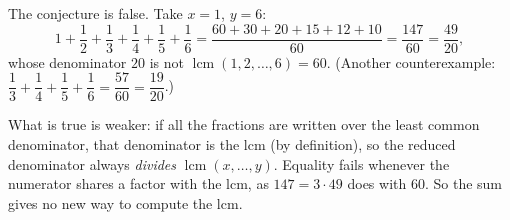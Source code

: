 The conjecture is false. Take $x=1$, $y=6$:
\[
1+\dfrac{1}{2}+\dfrac{1}{3}+\dfrac{1}{4}+\dfrac{1}{5}+\dfrac{1}{6}=\dfrac{60+30+20+15+12+10}{60}=\dfrac{147}{60}=\dfrac{49}{20},
\]
whose denominator $20$ is not $\operatorname{lcm}(1,2,\dots,6)=60$. (Another counterexample: $\dfrac{1}{3}+\dfrac{1}{4}+\dfrac{1}{5}+\dfrac{1}{6}=\dfrac{57}{60}=\dfrac{19}{20}$.)

What is true is weaker: if all the fractions are written over the least common denominator, that denominator is the lcm (by definition), so the reduced denominator always \emph{divides} $\operatorname{lcm}(x,\dots,y)$. Equality fails whenever the numerator shares a factor with the lcm, as $147=3\cdot49$ does with $60$. So the sum gives no new way to compute the lcm.
